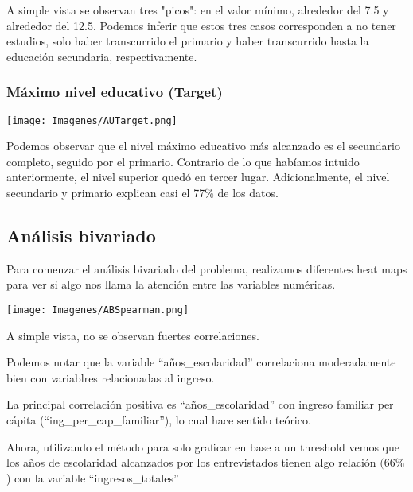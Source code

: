 \documentclass[a4paper]{article}
\begin{document}
            A simple vista se observan tres "picos": en el valor mínimo, alrededor del 7.5 y alrededor del 12.5. Podemos inferir que estos tres casos corresponden a no tener estudios, solo haber transcurrido el primario y haber transcurrido hasta la educación secundaria, respectivamente.
           
            \subsubsection{Máximo nivel educativo (Target)}
           
            \begin{center}
                \texttt{[image: Imagenes/AUTarget.png]}    
            \end{center}
           
            Podemos observar que el nivel máximo educativo más alcanzado es el secundario completo, seguido por el primario. Contrario de lo que habíamos intuido anteriormente, el nivel superior quedó en tercer lugar. Adicionalmente, el nivel secundario y primario explican casi el 77\% de los datos.
 
    \newpage

    \subsection{Análisis bivariado}
 
        Para comenzar el análisis bivariado del problema, realizamos diferentes heat maps para ver si algo nos llama la atención entre las variables numéricas.        
       
        \begin{center}
            \texttt{[image: Imagenes/ABSpearman.png]}
        \end{center}
 
        A simple vista, no se observan fuertes correlaciones.
 
        Podemos notar que la variable ``años\_escolaridad'' correlaciona moderadamente bien con variablres relacionadas al ingreso.
 
        La principal correlación positiva es ``años\_escolaridad'' con ingreso familiar per cápita (``ing\_per\_cap\_familiar''), lo cual hace sentido teórico.
 
        Ahora, utilizando el método para solo graficar en base a un threshold vemos que los años de escolaridad alcanzados por los entrevistados tienen algo relación $(66\%$) con la variable ``ingresos\_totales''
\end{document}
